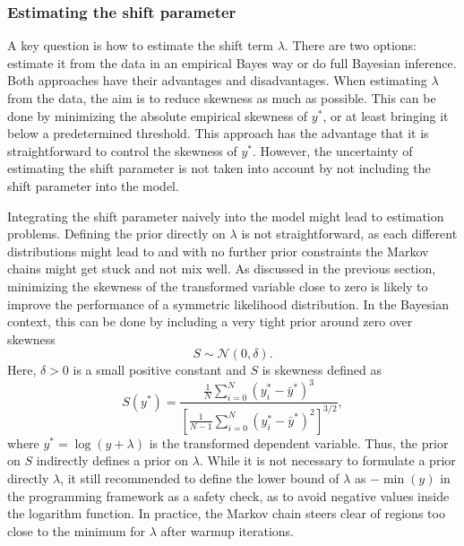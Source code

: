 \subsubsection{Estimating the shift parameter}
A key question is how to estimate the shift term $\lambda$.
There are two options: estimate it from the data in an empirical Bayes way or do full Bayesian inference.
Both approaches have their advantages and disadvantages.
When estimating $\lambda$ from the data, the aim is to reduce skewness as much as possible.
This can be done by minimizing the absolute empirical skewness of $y^*$, or at least bringing it below a predetermined threshold.
This approach has the advantage that it is straightforward to control the skewness of $y^*$.
However, the uncertainty of estimating the shift parameter is not taken into account by not including the shift parameter into the model.

Integrating the shift parameter naively into the model might lead to estimation problems.
Defining the prior directly on $\lambda$ is not straightforward, as each different distributions might lead to  and with no further prior constraints the Markov chains might get stuck and not mix well.
As discussed in the previous section, minimizing the skewness of the transformed variable close to zero is likely to improve the performance of a symmetric likelihood distribution.
In the Bayesian context, this can be done by including a very tight prior around zero over skewness
\begin{equation*}
    S \sim \mathcal N(0, \delta).
\end{equation*}
Here, $\delta > 0$ is a small positive constant and $S$ is skewness defined as
\begin{equation*}
    \displaystyle S(y^*) =  \frac{\frac 1 N \sum^{N}_{i = 0} (y_i^* - \bar y^* )^3}
    {\left[ \frac{1}{N - 1} \sum^{N}_{i = 0} (y_i^* - \bar y^* )^2 \right]^{3/2}},
\end{equation*}
where $y^* = \log(y + \lambda)$ is the transformed dependent variable. Thus, the prior on $S$ indirectly defines a prior on $\lambda$.
While it is not necessary to formulate a prior directly $\lambda$, it still recommended to define the lower bound of $\lambda$ as $-\min(y)$ in the programming framework as a safety check, as to avoid negative values inside the logarithm function.
In practice, the Markov chain steers clear of regions too close to the minimum for $\lambda$ after warmup iterations.

